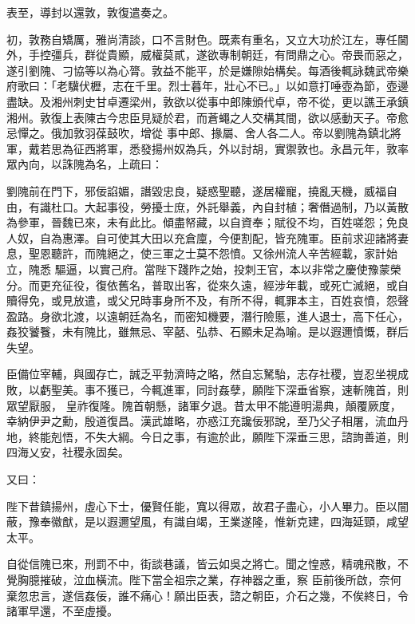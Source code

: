 \begin{pinyinscope}
 表至，導封以還敦，敦復遣奏之。



 初，敦務自矯厲，雅尚清談，口不言財色。既素有重名，又立大功於江左，專任閫外，手控彊兵，群從貴顯，威權莫貳，遂欲專制朝廷，有問鼎之心。帝畏而惡之，遂引劉隗、刁協等以為心膂。敦益不能平，於是嫌隙始構矣。每酒後輒詠魏武帝樂府歌曰：「老驥伏櫪，志在千里。烈士暮年，壯心不已。」以如意打唾壺為節，壺邊盡缺。及湘州刺史甘卓遷梁州，敦欲以從事中郎陳頒代卓，帝不從，更以譙王承鎮湘州。敦復上表陳古今忠臣見疑於君，而蒼蠅之人交構其間，欲以感動天子。帝愈忌憚之。俄加敦羽葆鼓吹，增從
 事中郎、掾屬、舍人各二人。帝以劉隗為鎮北將軍，戴若思為征西將軍，悉發揚州奴為兵，外以討胡，實禦敦也。永昌元年，敦率眾內向，以誅隗為名，上疏曰：



 劉隗前在門下，邪佞諂媚，譖毀忠良，疑惑聖聽，遂居權寵，撓亂天機，威福自由，有識杜口。大起事役，勞擾士庶，外託舉義，內自封植；奢僭過制，乃以黃散為參軍，晉魏已來，未有此比。傾盡帑藏，以自資奉；賦役不均，百姓嗟怨；免良人奴，自為惠澤。自可使其大田以充倉廩，今便割配，皆充隗軍。臣前求迎諸將妻息，聖恩聽許，而隗絕之，使三軍之士莫不怨憤。又徐州流人辛苦經載，家計始立，隗悉
 驅逼，以實己府。當陛下踐阼之始，投刺王官，本以非常之慶使豫蒙榮分。而更充征役，復依舊名，普取出客，從來久遠，經涉年載，或死亡滅絕，或自贖得免，或見放遣，或父兄時事身所不及，有所不得，輒罪本主，百姓哀憤，怨聲盈路。身欲北渡，以遠朝廷為名，而密知機要，潛行險慝，進人退士，高下任心，姦狡饕餮，未有隗比，雖無忌、宰嚭、弘恭、石顯未足為喻。是以遐邇憤慨，群后失望。



 臣備位宰輔，與國存亡，誠乏平勃濟時之略，然自忘駑駘，志存社稷，豈忍坐視成敗，以虧聖美。事不獲已，今輒進軍，同討姦孽，願陛下深垂省察，速斬隗首，則眾望厭服，
 皇祚復隆。隗首朝懸，諸軍夕退。昔太甲不能遵明湯典，顛覆厥度，幸納伊尹之勳，殷道復昌。漢武雄略，亦惑江充讒佞邪說，至乃父子相屠，流血丹地，終能剋悟，不失大綱。今日之事，有逾於此，願陛下深垂三思，諮詢善道，則四海乂安，社稷永固矣。



 又曰：



 陛下昔鎮揚州，虛心下士，優賢任能，寬以得眾，故君子盡心，小人畢力。臣以闇蔽，豫奉徽猷，是以遐邇望風，有識自竭，王業遂隆，惟新克建，四海延頸，咸望太平。



 自從信隗已來，刑罰不中，街談巷議，皆云如吳之將亡。聞之惶惑，精魂飛散，不覺胸臆摧破，泣血橫流。陛下當全祖宗之業，存神器之重，察
 臣前後所啟，奈何棄忽忠言，遂信姦佞，誰不痛心！願出臣表，諮之朝臣，介石之幾，不俟終日，令諸軍早還，不至虛擾。




\end{pinyinscope}
